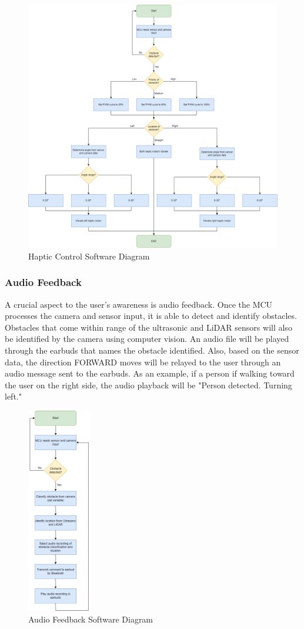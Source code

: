\begin{figure}[H]
	\centering
	\includegraphics[width=.7\textwidth]{./Images/hapticsw.png}
	\caption{\label{fig:hapticsw}Haptic Control Software Diagram}
\end{figure}

\subsubsection{Audio Feedback}

\noindent A crucial aspect to the user's awareness is audio feedback. Once the MCU processes the camera and sensor input, it is able to detect and identify obstacles. Obstacles that come within range of the ultrasonic and LiDAR sensors will also be identified by the camera using computer vision. An audio file will be played through the earbuds that names the obstacle identified. Also, based on the sensor data, the direction FORWARD moves will be relayed to the user through an audio message sent to the earbuds. As an example, if a person if walking toward the user on the right side, the audio playback will be "Person detected. Turning left."\\

\begin{figure}[H]
	\centering
	\includegraphics[width=0.25\textwidth]{./Images/audio2.drawio.png}
	\caption{\label{fig:audiosw}Audio Feedback Software Diagram}
\end{figure}

